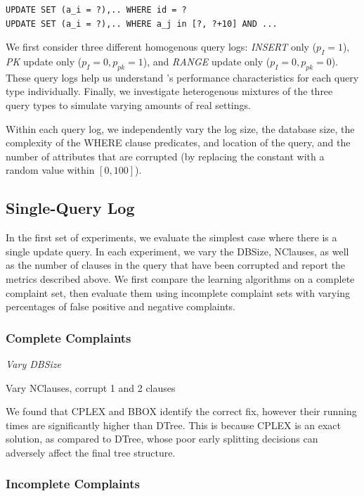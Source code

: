 {\scriptsize
\begin{verbatim}
UPDATE SET (a_i = ?),.. WHERE id = ?
UPDATE SET (a_i = ?),.. WHERE a_j in [?, ?+10] AND ...
\end{verbatim}
}

We first consider three different homogenous query logs: {\it INSERT} only ($p_I = 1$), 
{\it PK} update only ($p_I = 0, p_{pk} = 1$), and {\it RANGE} update only ($p_I = 0, p_{pk} = 0$).
These query logs help us understand \sys's performance characteristics for each query type individually.  
Finally, we investigate heterogenous mixtures of the three query types to simulate varying amounts of real settings.

Within each query log, we independently vary the log size, the
database size, the complexity of the WHERE clause predicates, and
location of the query, and the number of attributes that are corrupted
(by replacing the constant with a random value within $[0, 100]$).





\subsection{Single-Query Log}

In the first set of experiments, we evaluate the simplest case where there
is a single update query.  In each experiment, we vary the DBSize,
NClauses, as well as the number of clauses in the query that have
been corrupted and report the metrics described above.  We first 
compare the learning algorithms on a complete complaint set, then evaluate them
using incomplete complaint sets with varying percentages of false positive and negative complaints.

\subsubsection{Complete Complaints}

{\it Vary DBSize

Vary NClauses, corrupt 1 and 2 clauses
}

We found that CPLEX and BBOX identify the correct fix, however their
running times are significantly higher than DTree.  This is because
CPLEX is an exact solution, as compared to DTree, whose poor early
splitting decisions can adversely affect the final tree structure.

\subsubsection{Incomplete Complaints}


